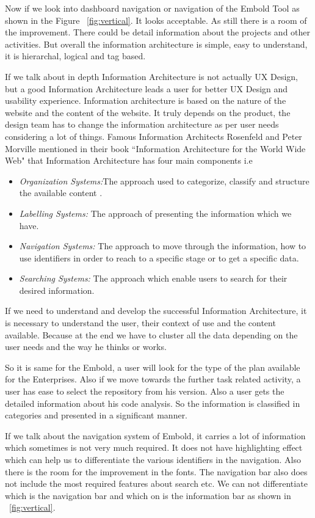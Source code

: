 \indent Now if we look into dashboard navigation or navigation of the Embold Tool as shown in the Figure ~\ref{fig:vertical}.  It looks acceptable. As still there is a room of the improvement. There could be detail information about the projects and other activities. But overall the information architecture is simple, easy to understand, it is hierarchal, logical and tag based. \par
If we talk about in depth Information Architecture is not actually UX Design, but a good Information Architecture leads a user for better UX Design and usability experience. Information architecture is based on the nature of the website and the content of the website. It truly depends on the product, the design team has to change the information architecture as per user needs considering a lot of things. Famous Information Architects Rosenfeld and Peter Morville mentioned in their book ``Information Architecture for the World Wide Web" that Information Architecture has four main components i.e 
\begin{itemize}
\item\emph{Organization Systems:}The approach used to categorize, classify and structure the available content .
\item\emph{Labelling Systems:} The approach of presenting the information which we have. 
\item\emph{Navigation Systems:}  The approach to move through the information, how to use identifiers in order to reach to a specific stage or to get a specific data.
\item\emph{Searching Systems:} The approach which enable users to search for their desired information. 
\end{itemize} 
If we need to understand and develop the successful Information Architecture, it is necessary to understand the user, their context of use and the content available. Because at the end we have to cluster all the data depending on the user needs and the way he thinks or works. ~\cite{IA} \par
So it is same for the  Embold, a user will look for the type of the plan available for the Enterprises. Also if we move towards the further task related activity, a user has ease to select the repository from his version. Also a user gets the detailed information about his code analysis. So the information is classified in categories and presented in a significant manner.\par
If we talk about the navigation system of Embold, it carries a lot of information which sometimes is not very much required. It does not have highlighting effect which can help us to differentiate the various identifiers in the navigation. Also there is the room  for the improvement in the fonts.  The navigation bar also does not include the most required features about search etc. We can not differentiate which is the navigation bar and which on is the information bar as shown in ~\ref{fig:vertical}. \par
